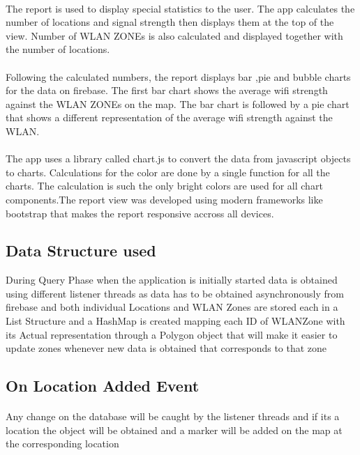\paragraph{}The report is used to display special statistics to the user. The app calculates the number of locations and signal strength then displays them at the top of the view. Number of WLAN ZONEs is also calculated and displayed together with the number of locations.

\paragraph{}Following the calculated numbers, the report displays bar ,pie and bubble charts for the data on firebase. The first bar chart shows the average wifi strength against the WLAN ZONEs on the map. The bar chart is followed by a pie chart that shows a different representation of the average wifi strength against the WLAN.

\paragraph{}The app uses a library called chart.js to convert the data from javascript objects to charts. Calculations for the color are done by a single function for all the charts. The calculation is such the only bright colors are used for all chart components.The report view was developed using modern frameworks like bootstrap that makes the report responsive accross all devices.

\subsection*{Data Structure used}

During Query Phase when the application is initially started data is obtained using different listener threads as data has to be obtained asynchronously from firebase and both individual Locations and WLAN Zones are stored each in a List Structure and a HashMap is created mapping each ID of WLANZone with its Actual representation through a Polygon object that will make it easier to update zones whenever new data is obtained that corresponds to that zone 

\subsection*{On Location Added Event} 
\paragraph{}Any change on the database will be caught by the listener threads and if its a location the object will be obtained and a marker will be added on the map at the corresponding location      

